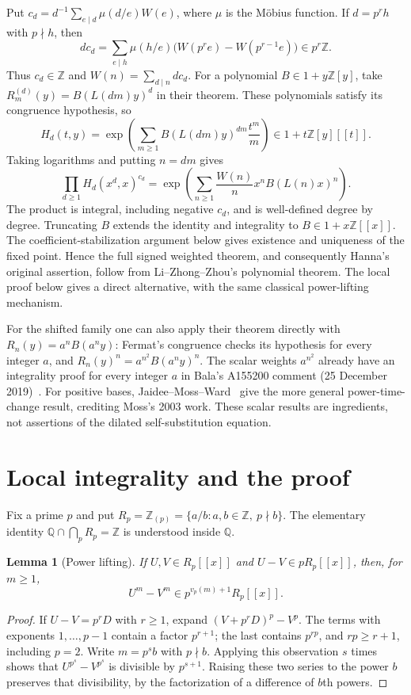 \documentclass[11pt]{article}
\newtheorem{lemma}[theorem]{Lemma}
\newcommand{\Z}{\mathbb Z}
\newcommand{\Q}{\mathbb Q}
\begin{document}
Put $c_d=d^{-1}\sum_{e\mid d}\mu(d/e)W(e)$, where $\mu$ is the
M\"obius function. If $d=p^rh$ with $p\nmid h$, then
\[
 dc_d=\sum_{e\mid h}\mu(h/e)
       \bigl(W(p^re)-W(p^{r-1}e)\bigr)\in p^r\Z.
\]
Thus $c_d\in\Z$ and $W(n)=\sum_{d\mid n}dc_d$.
For a polynomial $B\in1+y\Z[y]$, take
$R_m^{(d)}(y)=B(L(dm)y)^d$ in their theorem. These polynomials satisfy
its congruence hypothesis, so
\[
 H_d(t,y)=\exp\left(\sum_{m\geq1}
       B(L(dm)y)^{dm}\frac{t^m}{m}\right)\in1+t\Z[y][[t]].
\]
Taking logarithms and putting $n=dm$ gives
\[
 \prod_{d\geq1}H_d(x^d,x)^{c_d}
 =\exp\left(\sum_{n\geq1}\frac{W(n)}n x^nB(L(n)x)^n\right).
\]
The product is integral, including negative $c_d$, and is well-defined
degree by degree. Truncating $B$ extends the identity and integrality to
$B\in1+x\Z[[x]]$. The coefficient-stabilization argument below gives
existence and uniqueness of the fixed point. Hence the full signed weighted
theorem, and consequently Hanna's original assertion, follow from
Li--Zhong--Zhou's polynomial theorem. The local proof below gives a direct
alternative, with the same classical power-lifting mechanism.

For the shifted family one can also apply their theorem directly with
$R_n(y)=a^nB(a^ny)$: Fermat's congruence checks its hypothesis for every
integer $a$, and $R_n(y)^n=a^{n^2}B(a^ny)^n$.
The scalar weights $a^{n^2}$ already have an integrality proof for every
integer $a$ in Bala's A155200 comment (25 December 2019)~\cite{bala}.
For positive bases, Jaidee--Moss--Ward~\cite[Theorem 2 and Example 7]{jmw}
give the more general power-time-change result, crediting Moss's 2003 work.
These scalar results are ingredients, not assertions of the dilated
self-substitution equation.

\section{Local integrality and the proof}

Fix a prime $p$ and put
$R_p=\Z_{(p)}=\{a/b:a,b\in\Z,\ p\nmid b\}$.
The elementary identity
$\Q\cap\bigcap_p R_p=\Z$ is understood inside $\Q$.

\begin{lemma}[Power lifting]\label{lifting}
If $U,V\in R_p[[x]]$ and $U-V\in pR_p[[x]]$, then, for $m\geq1$,
\[
 U^m-V^m\in p^{v_p(m)+1}R_p[[x]].
\]
\end{lemma}
\begin{proof}
If $U-V=p^rD$ with $r\geq1$, expand $(V+p^rD)^p-V^p$.
The terms with exponents $1,\ldots,p-1$ contain a factor $p^{r+1}$;
the last contains $p^{rp}$, and $rp\geq r+1$, including $p=2$.
Write $m=p^sb$ with $p\nmid b$. Applying this observation $s$ times
shows that $U^{p^s}-V^{p^s}$ is divisible by $p^{s+1}$.
Raising these two series to the power $b$ preserves that divisibility,
by the factorization of a difference of $b$th powers.
\end{proof}
\end{document}
